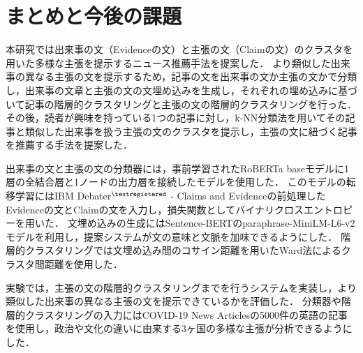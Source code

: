 \documentclass[12pt,a4j]{jreport}
\begin{document}


\chapter{まとめと今後の課題}
\label{chapter_conclusion}

本研究では出来事の文（Evidenceの文）と主張の文（Claimの文）のクラスタを用いた多様な主張を提示するニュース推薦手法を提案した．
より類似した出来事の異なる主張の文を提示するため，記事の文を出来事の文か主張の文かで分類し，出来事の文章と主張の文の文埋め込みを生成し，それぞれの埋め込みに基づいて記事の階層的クラスタリングと主張の文の階層的クラスタリングを行った．
その後，読者が興味を持っている1つの記事に対し，k-NN分類法を用いてその記事と類似した出来事を扱う主張の文のクラスタを提示し，主張の文に紐づく記事を推薦する手法を提案した．

出来事の文と主張の文の分類器には，事前学習されたRoBERTa baseモデルに1層の全結合層と1ノードの出力層を接続したモデルを使用した．
このモデルの転移学習にはIBM Debater$^{\textregistered}$ - Claims and Evidenceの前処理したEvidenceの文とClaimの文を入力し，損失関数としてバイナリクロスエントロピーを用いた．
文埋め込みの生成にはSentence-BERTのparaphrase-MiniLM-L6-v2モデルを利用し，提案システムが文の意味と文脈を加味できるようにした．
階層的クラスタリングでは文埋め込み間のコサイン距離を用いたWard法によるクラスタ間距離を使用した．

実験では，主張の文の階層的クラスタリングまでを行うシステムを実装し，より類似した出来事の異なる主張の文を提示できているかを評価した．
分類器や階層的クラスタリングの入力にはCOVID-19 News Articlesの5000件の英語の記事を使用し，政治や文化の違いに由来する3ヶ国の多様な主張が分析できるようにした．
\end{document}
